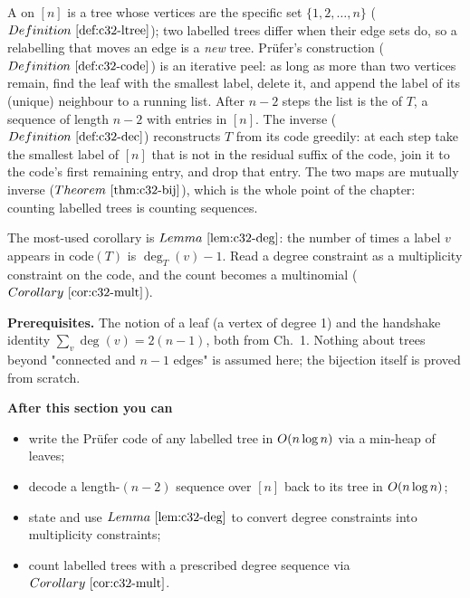 \begin{topicintro}
A  on \([n]\) is a tree whose vertices are the specific
set \(\{1,2,\dots,n\}\) (\(\defref{c32-ltree}\)); two labelled trees differ
when their edge sets do, so a relabelling that moves an edge is a \emph{new}
tree.  Pr\"ufer's construction (\(\defref{c32-code}\)) is an iterative peel:
as long as more than two vertices remain, find the leaf with the smallest
label, delete it, and append the label of its (unique) neighbour to a running
list.  After \(n-2\) steps the list is the  of \(T\), a
sequence of length \(n-2\) with entries in \([n]\).  The inverse
(\(\defref{c32-dec}\)) reconstructs \(T\) from its code greedily: at each step
take the smallest label of \([n]\) that is not in the residual suffix of the
code, join it to the code's first remaining entry, and drop that entry.  The
two maps are mutually inverse (\(\thmref{c32-bij}\)), which is the whole point
of the chapter: counting labelled trees is counting sequences.

The most-used corollary is \(\lemref{c32-deg}\): the number of times a label
\(v\) appears in \(\mathrm{code}(T)\) is \(\deg_T(v)-1\).  Read a degree
constraint as a multiplicity constraint on the code, and the count becomes a
multinomial (\(\corref{c32-mult}\)).

\textbf{Prerequisites.} The notion of a leaf (a vertex of degree 1) and the
handshake identity \(\sum_v \deg(v) = 2(n-1)\), both from Ch.~1.  Nothing
about trees beyond "connected and \(n-1\) edges" is assumed here; the
bijection itself is proved from scratch.

\textbf{After this section you can}
\begin{itemize}[nosep]
  \item write the Pr\"ufer code of any labelled tree in \(O(n\log n)\) via a min-heap of leaves; \hfill{}
  \item decode a length-\((n-2)\) sequence over \([n]\) back to its tree in \(O(n\log n)\); \hfill{}
  \item state and use \(\lemref{c32-deg}\) to convert degree constraints into multiplicity constraints; \hfill{}
  \item count labelled trees with a prescribed degree sequence via \(\corref{c32-mult}\). \hfill{}
\end{itemize}
\end{topicintro}

